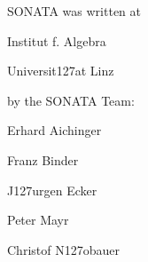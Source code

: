 
SONATA was written at
\begingroup
\smallskip \parindent3pc \parskip 0pt
\item{} Institut f. Algebra
\item{} Universit\accent127at Linz
\endgroup

by the SONATA Team:

\begingroup
\smallskip \parindent3pc \parskip 0pt
\item{} Erhard Aichinger
\item{} Franz Binder
\item{} J\accent127urgen Ecker
\item{} Peter Mayr
\item{} Christof N\accent127obauer
\endgroup



